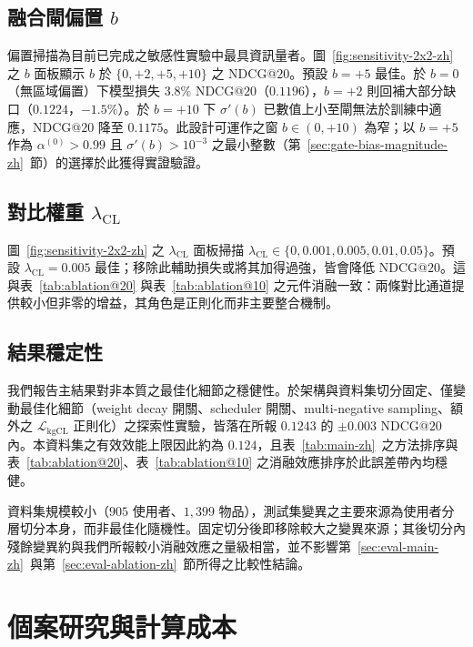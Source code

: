\subsection{融合閘偏置 $b$}
\label{sec:sens-bias-zh}

偏置掃描為目前已完成之敏感性實驗中最具資訊量者。圖~\ref{fig:sensitivity-2x2-zh} 之 $b$ 面板顯示 $b$ 於 $\{0, +2, +5, +10\}$ 之 NDCG@$20$。預設 $b = +5$ 最佳。於 $b = 0$（無區域偏置）下模型損失 $3.8\%$ NDCG@$20$（$0.1196$），$b = +2$ 則回補大部分缺口（$0.1224$，$-1.5\%$）。於 $b = +10$ 下 $\sigma'(b)$ 已數值上小至閘無法於訓練中適應，NDCG@$20$ 降至 $0.1175$。此設計可運作之窗 $b \in (0, +10)$ 為窄；以 $b = +5$ 作為 $\alpha^{(0)} > 0.99$ 且 $\sigma'(b) > 10^{-3}$ 之最小整數（第~\ref{sec:gate-bias-magnitude-zh}~節）的選擇於此獲得實證驗證。

\subsection{對比權重 $\lambda_{\mathrm{CL}}$}
\label{sec:sens-lambda-zh}

圖~\ref{fig:sensitivity-2x2-zh} 之 $\lambda_{\mathrm{CL}}$ 面板掃描 $\lambda_{\mathrm{CL}} \in \{0, 0.001, 0.005, 0.01, 0.05\}$。預設 $\lambda_{\mathrm{CL}} = 0.005$ 最佳；移除此輔助損失或將其加得過強，皆會降低 NDCG@$20$。這與表~\ref{tab:ablation@20} 與表~\ref{tab:ablation@10} 之元件消融一致：兩條對比通道提供較小但非零的增益，其角色是正則化而非主要整合機制。

\subsection{結果穩定性}
\label{sec:eval-seed-zh}

我們報告主結果對非本質之最佳化細節之穩健性。於架構與資料集切分固定、僅變動最佳化細節（weight decay 開關、scheduler 開關、multi-negative sampling、額外之 $\mathcal{L}_{\mathrm{kgCL}}$ 正則化）之探索性實驗，皆落在所報 $0.1243$ 的 $\pm 0.003$ NDCG@$20$ 內。本資料集之有效效能上限因此約為 $0.124$，且表~\ref{tab:main-zh}~之方法排序與表~\ref{tab:ablation@20}、表~\ref{tab:ablation@10} 之消融效應排序於此誤差帶內均穩健。

資料集規模較小（$905$ 使用者、$1{,}399$ 物品），測試集變異之主要來源為使用者分層切分本身，而非最佳化隨機性。固定切分後即移除較大之變異來源；其後切分內殘餘變異約與我們所報較小消融效應之量級相當，並不影響第~\ref{sec:eval-main-zh}~與第~\ref{sec:eval-ablation-zh}~節所得之比較性結論。

\section{個案研究與計算成本}
\label{sec:eval-case-zh}


